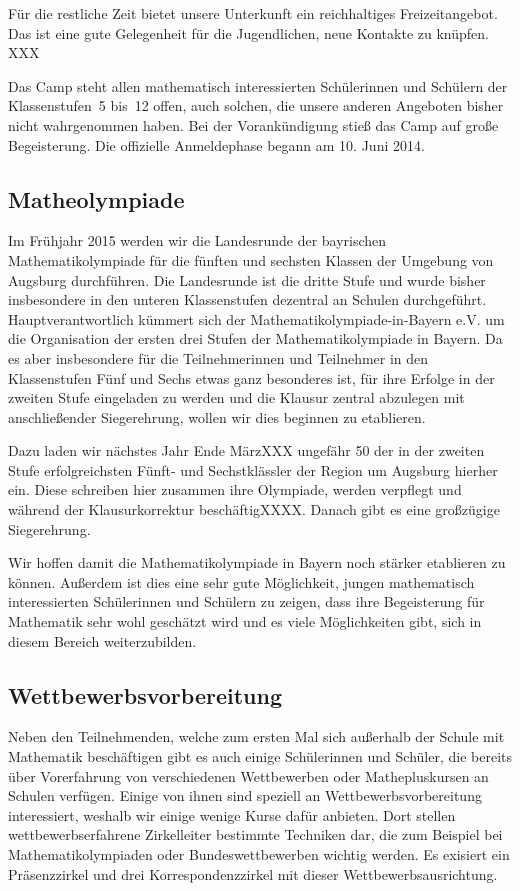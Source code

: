 \documentclass[12pt]{zettel}
\begin{document}
Für die restliche Zeit bietet unsere Unterkunft ein reichhaltiges
Freizeitangebot. Das ist eine gute Gelegenheit für die Jugendlichen, neue
Kontakte zu knüpfen. XXX

Das Camp steht allen mathematisch interessierten Schülerinnen und Schülern der
Klassenstufen~5 bis~12 offen, auch solchen, die unsere anderen Angeboten bisher
nicht wahrgenommen haben. Bei der Vorankündigung stieß das Camp auf große
Begeisterung. Die offizielle Anmeldephase begann am 10. Juni 2014.


\subsection{Matheolympiade}

Im Frühjahr 2015 werden wir die Landesrunde der bayrischen
Mathematikolympiade für die fünften und sechsten Klassen der Umgebung
von Augsburg durchführen. Die Landesrunde ist die dritte Stufe und wurde
bisher insbesondere in den unteren Klassenstufen dezentral an Schulen
durchgeführt. Hauptverantwortlich kümmert sich der
Mathematikolympiade-in-Bayern e.V. um die Organisation der ersten drei
Stufen der Mathematikolympiade in Bayern. Da es aber insbesondere für
die Teilnehmerinnen und Teilnehmer in den Klassenstufen Fünf und Sechs
etwas ganz besonderes ist, für ihre Erfolge in der zweiten Stufe
eingeladen zu werden und die Klausur zentral abzulegen mit
anschließender Siegerehrung, wollen wir dies beginnen zu etablieren.

Dazu laden wir nächstes Jahr Ende MärzXXX ungefähr 50 der in der zweiten
Stufe erfolgreichsten Fünft- und Sechstklässler der Region um Augsburg
hierher ein. Diese schreiben hier zusammen ihre Olympiade, werden
verpflegt und während der Klausurkorrektur beschäftigXXXX. Danach gibt
es eine großzügige Siegerehrung.

Wir hoffen damit die Mathematikolympiade in Bayern noch stärker
etablieren zu können. Außerdem ist dies eine sehr gute Möglichkeit,
jungen mathematisch interessierten Schülerinnen und Schülern zu zeigen,
dass ihre Begeisterung für Mathematik sehr wohl geschätzt wird und es
viele Möglichkeiten gibt, sich in diesem Bereich weiterzubilden.

\subsection{Wettbewerbsvorbereitung}

Neben den Teilnehmenden, welche zum ersten Mal sich außerhalb der Schule
mit Mathematik beschäftigen gibt es auch einige Schülerinnen und
Schüler, die bereits über Vorerfahrung von verschiedenen Wettbewerben
oder Mathepluskursen an Schulen verfügen. Einige von ihnen sind speziell
an Wettbewerbsvorbereitung interessiert, weshalb wir einige wenige Kurse
dafür anbieten. Dort stellen wettbewerbserfahrene Zirkelleiter bestimmte
Techniken dar, die zum Beispiel bei Mathematikolympiaden oder
Bundeswettbewerben wichtig werden. Es exisiert ein Präsenzzirkel und
drei Korrespondenzzirkel mit dieser Wettbewerbsausrichtung.
\end{document}
